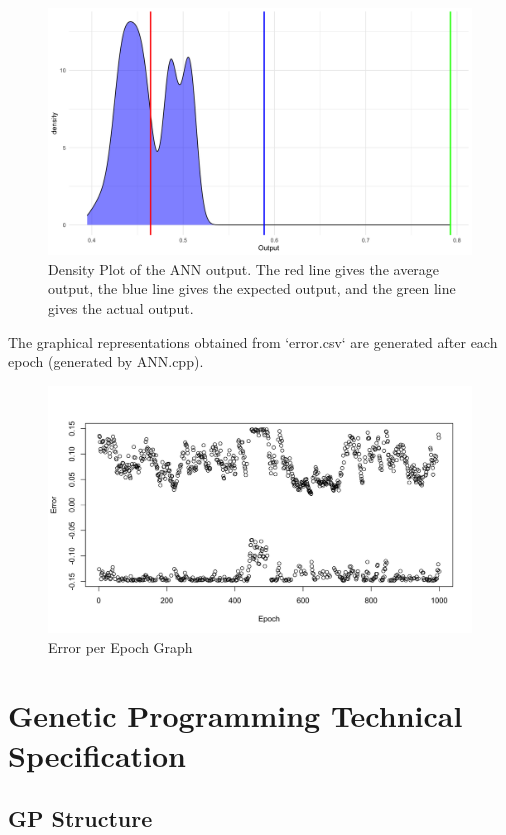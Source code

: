 \documentclass{article}
\begin{document}
    \begin{figure}[H]
        \includegraphics[width=\linewidth]{densityPlot.png}
        \caption{Density Plot of the ANN output. The red line gives the average output, the blue line gives the expected output, and the green line gives the actual output.}
        \label{fig:sa}
    \end{figure}

The graphical representations obtained from `error.csv` are generated after each epoch (generated by ANN.cpp).
    \begin{figure}[H]
        \includegraphics[width=\linewidth]{error.png}
        \caption{Error per Epoch Graph}
        \label{fig:epoch}
    \end{figure}

\section{Genetic Programming Technical Specification}
\subsection{GP Structure}
\end{document}
